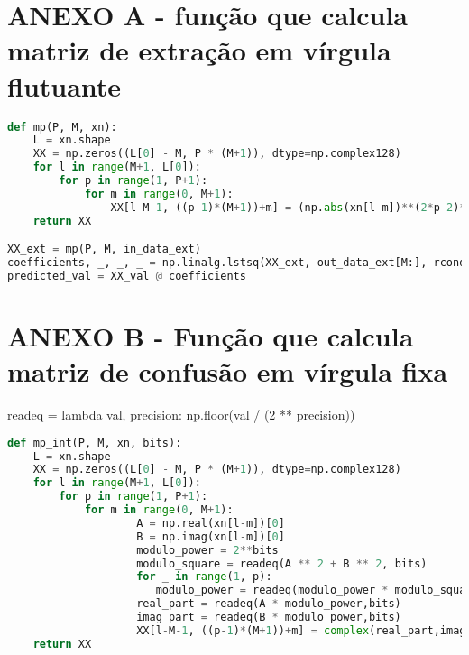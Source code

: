 \chapter*{\normalsize ANEXO A - função que calcula matriz de extração em vírgula flutuante}
\label{cod:mp}
\small %
\begin{lstlisting}[language = Python, ]
def mp(P, M, xn):
    L = xn.shape
    XX = np.zeros((L[0] - M, P * (M+1)), dtype=np.complex128)
    for l in range(M+1, L[0]):
        for p in range(1, P+1):
            for m in range(0, M+1):
                XX[l-M-1, ((p-1)*(M+1))+m] = (np.abs(xn[l-m])**(2*p-2)*(xn[l-m]))[0]
    return XX

XX_ext = mp(P, M, in_data_ext)
coefficients, _, _, _ = np.linalg.lstsq(XX_ext, out_data_ext[M:], rcond=None)
predicted_val = XX_val @ coefficients

\end{lstlisting}

\chapter*{\normalsize ANEXO B - Função que calcula matriz de confusão em vírgula fixa}

readeq = lambda val, precision: np.floor(val / (2 ** precision))

\label{cod:mpint}
\small %
\begin{lstlisting}[language = Python, ]
    def mp_int(P, M, xn, bits):
    L = xn.shape
    XX = np.zeros((L[0] - M, P * (M+1)), dtype=np.complex128)
    for l in range(M+1, L[0]):
        for p in range(1, P+1):
            for m in range(0, M+1):
                    A = np.real(xn[l-m])[0]
                    B = np.imag(xn[l-m])[0]
                    modulo_power = 2**bits 
                    modulo_square = readeq(A ** 2 + B ** 2, bits)
                    for _ in range(1, p):
                       modulo_power = readeq(modulo_power * modulo_square, bits)
                    real_part = readeq(A * modulo_power,bits)
                    imag_part = readeq(B * modulo_power,bits)
                    XX[l-M-1, ((p-1)*(M+1))+m] = complex(real_part,imag_part)        
    return XX

\end{lstlisting}
